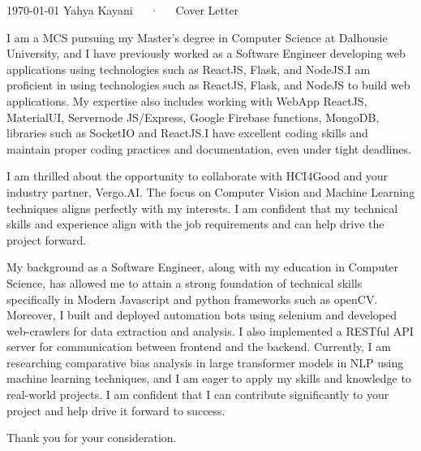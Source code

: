 \documentclass[11pt, a4paper]{awesome-cv}
\begin{document}
\makecvheader[R]

\makecvfooter
  {\today}
  {Yahya Kayani~~~·~~~Cover Letter}
  {}

\makelettertitle

\begin{cvletter}

I am a MCS pursuing my Master's degree in Computer Science at Dalhousie University, and I have previously worked 
as a Software Engineer developing web applications using technologies such as ReactJS, Flask, and NodeJS.I am proficient in using technologies such as ReactJS, Flask, and NodeJS to build web applications. 
My expertise also includes working with WebApp ReactJS, MaterialUI, Servernode JS/Express, Google Firebase functions, 
MongoDB, libraries such as SocketIO and ReactJS.I have excellent coding skills and maintain proper coding practices and documentation, even under tight deadlines.

I am thrilled about the opportunity to collaborate with HCI4Good and your industry partner, Vergo.AI. The focus on Computer Vision and Machine Learning 
techniques aligns perfectly with my interests. I am confident that my technical skills and  experience align with the job 
requirements and can help drive the project forward.

My background as a Software Engineer, along with my education in Computer Science, has allowed me to attain a strong foundation
of technical skills specifically in Modern Javascript and python frameworks such as openCV. Moreover, I built and deployed automation bots using selenium and developed web-crawlers 
for data extraction and analysis. I also implemented a RESTful API server for communication between frontend and the backend.
Currently, I am researching comparative bias analysis in large transformer models in NLP using machine learning techniques, and I am eager to apply my skills and knowledge 
to real-world projects. I am confident that I can contribute significantly to your project and help drive it forward to success.

Thank you for your consideration.


\end{cvletter}


\makeletterclosing
\end{document}
